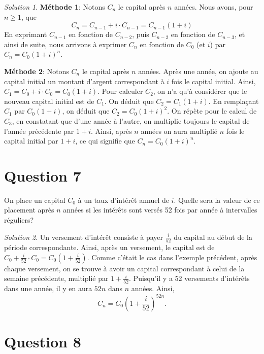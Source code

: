 \documentclass[
  12pt,
  letterpaper,
]{book}
\theoremstyle{remark}
\newtheorem*{solution}{Solution}
\begin{document}
\begin{solution}

\textbf{Méthode 1}: Notons \(C_n\) le capital après \(n\) années. Nous
avons, pour \(n\geq 1\), que \[C_n=C_{n-1}+i\cdot C_{n-1}=C_{n-1}(1+i)\]
En exprimant \(C_{n-1}\) en fonction de \(C_{n-2}\), puis \(C_{n-2}\) en
fonction de \(C_{n-3}\), et ainsi de suite, nous arrivons à exprimer
\(C_n\) en fonction de \(C_0\) (et \(i\)) par \(C_n=C_0(1+i)^n\).

\textbf{Méthode 2}: Notons \(C_n\) le capital après \(n\) années. Après
une année, on ajoute au capital initial un montant d'argent
correspondant à \(i\) fois le capital initial. Ainsi,
\(C_1=C_0+i\cdot C_0=C_0(1+i).\) Pour calculer \(C_2\), on n'a qu'à
considérer que le nouveau capital initial est de \(C_1\). On déduit que
\(C_2=C_1(1+i)\). En remplaçant \(C_1\) par \(C_0(1+i)\), on déduit que
\(C_2=C_0(1+i)^2\). On répète pour le calcul de \(C_3\), en constatant
que d'une année à l'autre, on multiplie toujours le capital de l'année
précédente par \(1+i\). Ainsi, après \(n\) années on aura multiplié
\(n\) fois le capital initial par \(1+i\), ce qui signifie que
\(C_n=C_0(1+i)^n.\)

\end{solution}

\hypertarget{question-7}{%
\section{Question 7}\label{question-7}}

On place un capital \(C_0\) à un taux d'intérêt annuel de \(i%
\). Quelle sera la valeur de ce placement après \(n\) années si les
intérêts sont versés 52 fois par année à intervalles réguliers?

\begin{solution}

Un versement d'intérêt consiste à payer \(\frac{i}{52}\) du capital au
début de la période correspondante. Ainsi, après un versement, le
capital est de \(C_0+\frac{i}{52}\cdot C_0=C_0(1+\frac{i}{52})\). Comme
c'était le cas dans l'exemple précédent, après chaque versement, on se
trouve à avoir un capital correspondant à celui de la semaine
précédente, multiplié par \(1+\frac{i}{52}\). Puisqu'il y a 52
versements d'intérêts dans une année, il y en aura \(52n\) dans \(n\)
années. Ainsi, \[C_n=C_0\left(1+\frac{i}{52}\right)^{52n}.\]

\end{solution}

\hypertarget{question-8}{%
\section{Question 8}\label{question-8}}
\end{document}
